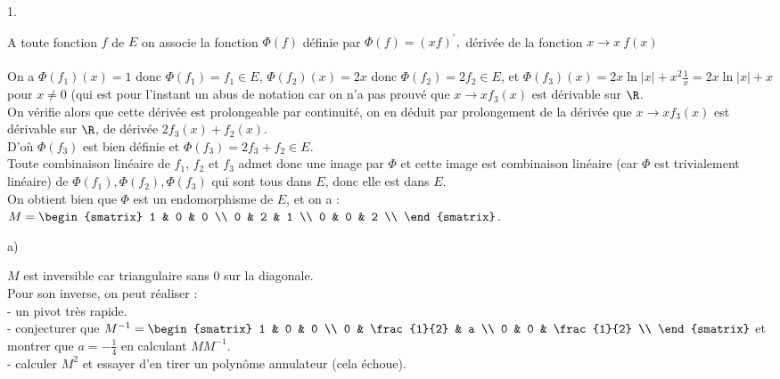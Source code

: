\documentclass[11pt]{article}%
\begin{document}
\begin{exercice}
\begin{noliste}{1.}
 \item A toute fonction $f$ de $E$ on associe la fonction $\Phi \left(
 f\right) $ définie par $\Phi \left( f\right) = \left( xf\right)
^{\prime
 },$ dérivée de la fonction $x\rightarrow x~f\left( x\right) $ \\
\\
 On a $\Phi (f_{1}) (x) = 1$ donc $\Phi (f_{1}) = f_{1} \in E$, $\Phi
(f_{2}) (x) = 2x$ donc $\Phi (f_{2}) = 2 f_{2} \in E$, et $\Phi (f_{3})
(x) = 2 x \ln | x | + x^{2} \frac{1}{x} = 2 x \ln | x | + x$ pour $x
\neq 0$ (qui est pour l'instant un abus de notation car on n'a pas
prouvé que $x \rightarrow x f_{3} (x)$ est dérivable sur $\R$. \\
 On vérifie alors que cette dérivée est prolongeable par continuité, on
en déduit par prolongement de la dérivée que $x \rightarrow x f_{3}
(x)$ est dérivable sur $\R$, de dérivée $2 f_{3}(x) + f_{2} (x)$. \\
 D'où $\Phi (f_{3})$ est bien définie et $\Phi (f_{3}) = 2 f_{3} +
f_{2} \in E$. \\
 Toute combinaison linéaire de $f_{1}$, $f_{2}$ et $f_{3}$ admet donc
une image par $\Phi$ et cette image est combinaison linéaire (car
$\Phi$ est trivialement linéaire) de $\Phi (f_{1}), \Phi (f_{2}), \Phi
(f_{3})$ qui sont tous dans $E$, donc elle est dans $E$. \\
 On obtient bien que $\Phi$ est un endomorphisme de $E$, et on a : $M =
\begin{smatrix}
1 & 0 & 0 \\
0 & 2 & 1 \\
0 & 0 & 2 \\
\end{smatrix}
$. \\

 \begin{noliste}{a)}
 \setlength{\itemsep}{2mm}
 \item $M$ est inversible car triangulaire sans 0 sur la diagonale. \\
 Pour son inverse, on peut réaliser : \\
 - un pivot très rapide. \\
 - conjecturer que $M^{-1} = \begin{smatrix}
1 & 0 & 0 \\
0 & \frac{1}{2} & a \\
0 & 0 & \frac{1}{2} \\
\end{smatrix}
$ et montrer que $a = -\frac{1}{4}$ en calculant $M M^{-1}$. \\
 - calculer $M^{2}$ et essayer d'en tirer un polynôme annulateur (cela
échoue). \\



\end{noliste}
\end{noliste}
\end{exercice}
\end{document}
